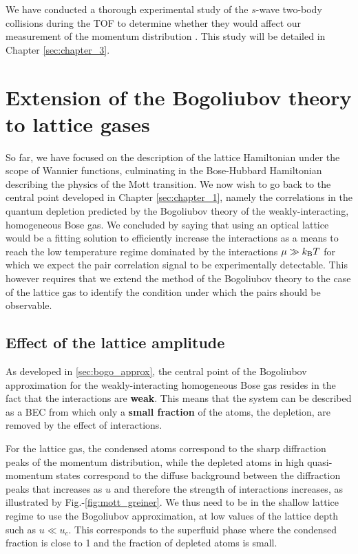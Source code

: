 We have conducted a thorough experimental study of the $s$-wave two-body collisions during the TOF to determine whether they would affect our measurement of the momentum distribution \cite{tenart2020two}. This study will be detailed in Chapter \ref{sec:chapter_3}.

\section{Extension of the Bogoliubov theory to lattice gases}

So far, we have focused on the description of the lattice Hamiltonian under the scope of Wannier functions, culminating in the Bose-Hubbard Hamiltonian describing the physics of the Mott transition. We now wish to go back to the central point developed in Chapter \ref{sec:chapter_1}, namely the \kmk correlations in the quantum depletion predicted by the Bogoliubov theory of the weakly-interacting, homogeneous Bose gas. We concluded by saying that using an optical lattice would be a fitting solution to efficiently increase the interactions as a means to reach the low temperature regime dominated by the interactions $\mu \gg k_{\mathrm{B}} T$ for which we expect the pair correlation signal to be experimentally detectable. This however requires that we extend the method of the Bogoliubov theory to the case of the lattice gas to identify the condition under which the \kmk pairs should be observable.

\subsection{Effect of the lattice amplitude}

As developed in \ref{sec:bogo_approx}, the central point of the Bogoliubov approximation for the weakly-interacting homogeneous Bose gas resides in the fact that the interactions are \textbf{weak}. This means that the system can be described as a BEC from which only a \textbf{small fraction} of the atoms, the depletion, are removed by the effect of interactions.

For the lattice gas, the condensed atoms correspond to the sharp diffraction peaks of the momentum distribution, while the depleted atoms in high quasi-momentum states correspond to the diffuse background between the diffraction peaks that increases as $u$ and therefore the strength of interactions increases, as illustrated by Fig.-\ref{fig:mott_greiner}. We thus need to be in the shallow lattice regime to use the Bogoliubov approximation, \ie at low values of the lattice depth such as $u \ll u_c$. This corresponds to the superfluid phase where the condensed fraction is close to 1 and the fraction of depleted atoms is small.


